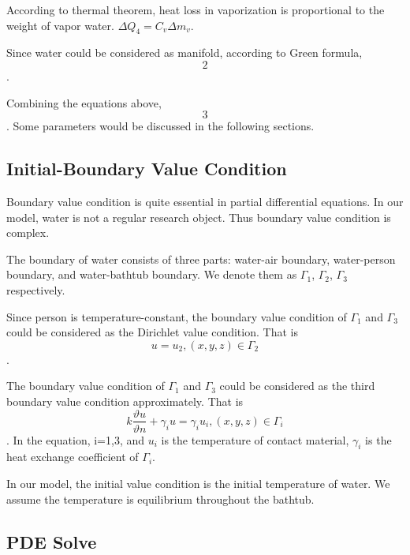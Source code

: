 \documentclass[12pt,a4paper,titlepage]{article}
\begin{document}
According to thermal theorem, heat loss in vaporization is proportional to
the weight of vapor water.
$\Delta Q_4={C_v}\Delta {m_v}$.

Since water could be considered as manifold, according to Green formula,
\begin{equation}
 2
\end{equation}.

Combining the equations above,
\begin{equation}
 3
\end{equation}.
Some parameters would be discussed in the following sections.

\subsection{Initial-Boundary Value Condition}
\label{initial-boundary value condition}

Boundary value condition is quite essential in partial differential equations. In our model, water is not a regular research object.
Thus boundary value condition is complex.

The boundary of water consists of three parts: water-air boundary, water-person boundary, and water-bathtub boundary. We denote them as
${\Gamma}_1$, ${\Gamma}_2$, ${\Gamma}_3$ respectively.

Since person is temperature-constant, the boundary value condition of ${\Gamma}_1$ and ${\Gamma}_3$ could be considered
as the Dirichlet value condition. That is
\begin{equation}
 u=u_2, (x,y,z)\in {\Gamma}_2
\end{equation}.

The boundary value condition of ${\Gamma}_1$ and ${\Gamma}_3$ could be considered as the third boundary value condition approximately. That is
\begin{equation}
 k\frac{\vartheta u}{\vartheta n}+{{\gamma}_i}u={{\gamma}_i}{u_i}, (x,y,z)\in {\Gamma}_i
\end{equation}.
In the equation, i=1,3, and $u_i$ is the temperature of contact material,
${\gamma}_i$ is the heat exchange coefficient of ${\Gamma}_i$.





In our model, the initial value condition is the initial temperature of water. We assume the temperature is equilibrium throughout the bathtub.

\subsection{PDE Solve}
\end{document}
